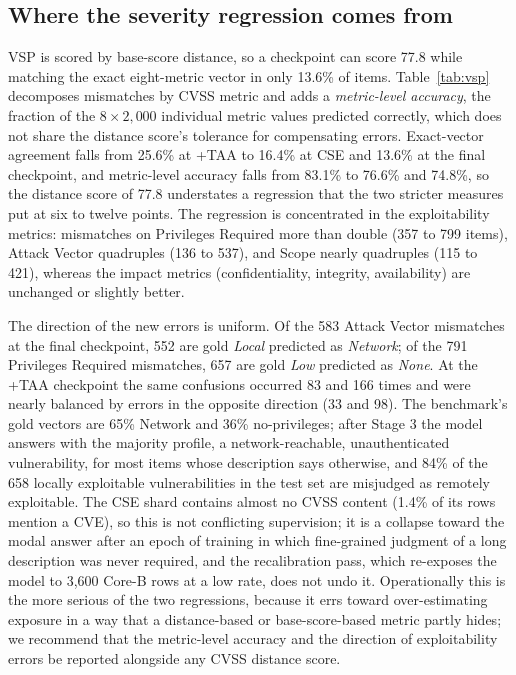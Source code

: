 \documentclass[twocolumn]{svjour3}
\begin{document}
\subsection{Where the severity regression comes from}\label{sec:vsp}
VSP is scored by base-score distance, so a checkpoint can score 77.8 while matching the exact eight-metric vector in only 13.6\% of items. Table~\ref{tab:vsp} decomposes mismatches by CVSS metric and adds a \emph{metric-level accuracy}, the fraction of the $8\times2{,}000$ individual metric values predicted correctly, which does not share the distance score's tolerance for compensating errors. Exact-vector agreement falls from 25.6\% at +TAA to 16.4\% at CSE and 13.6\% at the final checkpoint, and metric-level accuracy falls from 83.1\% to 76.6\% and 74.8\%, so the distance score of 77.8 understates a regression that the two stricter measures put at six to twelve points. The regression is concentrated in the exploitability metrics: mismatches on Privileges Required more than double (357 to 799 items), Attack Vector quadruples (136 to 537), and Scope nearly quadruples (115 to 421), whereas the impact metrics (confidentiality, integrity, availability) are unchanged or slightly better.

The direction of the new errors is uniform. Of the 583 Attack Vector mismatches at the final checkpoint, 552 are gold \emph{Local} predicted as \emph{Network}; of the 791 Privileges Required mismatches, 657 are gold \emph{Low} predicted as \emph{None}. At the +TAA checkpoint the same confusions occurred 83 and 166 times and were nearly balanced by errors in the opposite direction (33 and 98). The benchmark's gold vectors are 65\% Network and 36\% no-privileges; after Stage 3 the model answers with the majority profile, a network-reachable, unauthenticated vulnerability, for most items whose description says otherwise, and 84\% of the 658 locally exploitable vulnerabilities in the test set are misjudged as remotely exploitable. The CSE shard contains almost no CVSS content (1.4\% of its rows mention a CVE), so this is not conflicting supervision; it is a collapse toward the modal answer after an epoch of training in which fine-grained judgment of a long description was never required, and the recalibration pass, which re-exposes the model to 3,600 Core-B rows at a low rate, does not undo it. Operationally this is the more serious of the two regressions, because it errs toward over-estimating exposure in a way that a distance-based or base-score-based metric partly hides; we recommend that the metric-level accuracy and the direction of exploitability errors be reported alongside any CVSS distance score.
\end{document}
